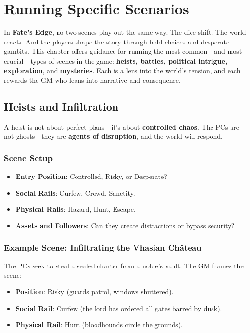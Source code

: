 \chapter{Running Specific Scenarios}

In \textbf{Fate’s Edge}, no two scenes play out the same way. The dice shift. The world reacts. And the players shape the story through bold choices and desperate gambits. This chapter offers guidance for running the most common—and most crucial—types of scenes in the game: \textbf{heists, battles, political intrigue, exploration}, and \textbf{mysteries}. Each is a lens into the world’s tension, and each rewards the GM who leans into narrative and consequence.

\section*{Heists and Infiltration}

A heist is not about perfect plans—it’s about \textbf{controlled chaos}. The PCs are not ghosts—they are \textbf{agents of disruption}, and the world will respond.

\subsection*{Scene Setup}

\begin{itemize}
    \item \textbf{Entry Position}: Controlled, Risky, or Desperate?
    \item \textbf{Social Rails}: Curfew, Crowd, Sanctity.
    \item \textbf{Physical Rails}: Hazard, Hunt, Escape.
    \item \textbf{Assets and Followers}: Can they create distractions or bypass security?
\end{itemize}

\subsection*{Example Scene: Infiltrating the Vhasian Château}

The PCs seek to steal a sealed charter from a noble’s vault. The GM frames the scene:

\begin{itemize}
    \item \textbf{Position}: Risky (guards patrol, windows shuttered).
    \item \textbf{Social Rail}: Curfew (the lord has ordered all gates barred by dusk).
    \item \textbf{Physical Rail}: Hunt (bloodhounds circle the grounds).
\end{itemize}

